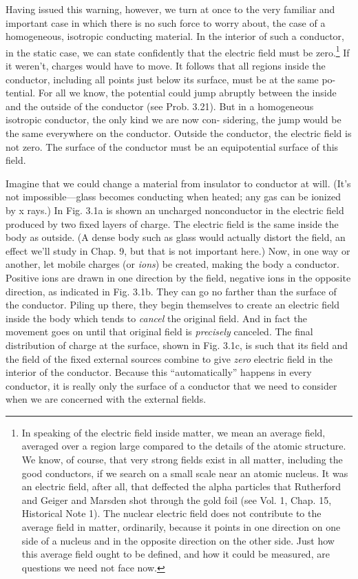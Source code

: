 Having issued this warning, however, we turn at once to the very
familiar and important case in which there is no such force to worry
about, the case of a homogeneous, isotropic conducting material.
In the interior of such a conductor, in the static case, we can state
confidently that the electric field must be zero.\footnote{In speaking of the electric field inside matter, we mean an average field, averaged
over a region large compared to the details of the atomic structure. We know, of course,
that very strong fields exist in all matter, including the good conductors, if we search
on a small scale near an atomic nucleus. It was an electric field, after all, that deffected
the alpha particles that Rutherford and Geiger and Marsden shot through the gold foil
(see Vol. 1, Chap. 15, Historical Note 1). The nuclear electric field does not contribute
to the average field in matter, ordinarily, because it points in one direction on one side
of a nucleus and in the opposite direction on the other side. Just how this average field
ought to be defined, and how it could be measured, are questions we need not face now.}
If it weren't, charges
would have to move. It follows that all regions inside the conductor,
including all points just below its surface, must be at the same po-
tential. For all we know, the potential could jump abruptly between
the inside and the outside of the conductor (see Prob. 3.21). But in
a homogeneous isotropic conductor, the only kind we are now con-
sidering, the jump would be the same everywhere on the conductor.
Outside the conductor, the electric field is not zero. The surface of
the conductor must be an equipotential surface of this field.

Imagine that we could change a material from insulator to conductor
at will. (It's not impossible---glass becomes conducting when
heated; any gas can be ionized by x rays.) In Fig. 3.1a is shown an
uncharged nonconductor in the electric field produced by two fixed
layers of charge. The electric field is the same inside the body as
outside. (A dense body such as glass would actually distort the field,
an effect we'll study in Chap. 9, but that is not important here.)
Now, in one way or another, let mobile charges (or \emph{ions}) be created,
making the body a conductor. Positive ions are drawn in one direction
by the field, negative ions in the opposite direction, as indicated
in Fig. 3.1b. They can go no farther than the surface of the conductor.
Piling up there, they begin themselves to create an electric
field inside the body which tends to \emph{cancel} the original field. And
in fact the movement goes on until that original field is \emph{precisely} canceled.
The final distribution of charge at the surface, shown in
Fig. 3.1c, is such that its field and the field of the fixed external
sources combine to give \emph{zero} electric field in the interior of the 
conductor. Because this ``automatically'' happens in every conductor,
it is really only the surface of a conductor that we need to consider
when we are concerned with the external fields.

